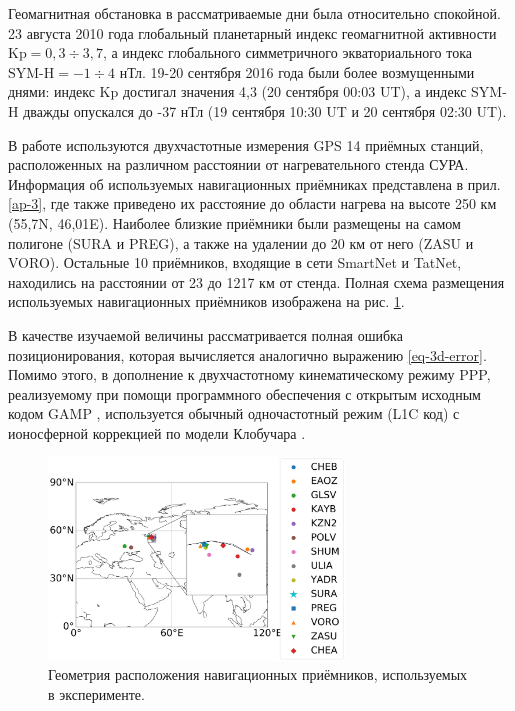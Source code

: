 Геомагнитная обстановка в рассматриваемые дни была относительно спокойной.
23 августа 2010 года глобальный планетарный индекс геомагнитной активности $\text{Kp}=0,3\div3,7$, а индекс глобального симметричного экваториального тока $\text{SYM-H}=-1\div4$ нТл.
19-20 сентября 2016 года были более возмущенными днями: индекс Kp достигал значения 4,3 (20 сентября 00:03 UT), а индекс SYM-H дважды опускался до -37 нТл (19 сентября 10:30 UT и 20 сентября 02:30 UT).

В работе используются двухчастотные измерения GPS 14 приёмных станций, расположенных на различном расстоянии от нагревательного стенда СУРА.
Информация об используемых навигационных приёмниках представлена в прил. \ref{ap-3}, где также приведено их расстояние до области нагрева на высоте 250 км (55,7\degree N, 46,01\degree E).
Наиболее близкие приёмники были размещены на самом полигоне (SURA и PREG), а также на удалении до 20 км от него (ZASU и VORO).
Остальные 10 приёмников, входящие в сети SmartNet и TatNet, находились на расстоянии от 23 до 1217 км от стенда.  
Полная схема размещения используемых навигационных приёмников изображена на рис. \ref{fig-sites}.

В качестве изучаемой величины рассматривается полная ошибка позиционирования, которая вычисляется аналогично выражению \eqref{eq-3d-error}.
Помимо этого, в дополнение к двухчастотному кинематическому режиму PPP, реализуемому при помощи программного обеспечения с открытым исходным кодом GAMP \cite{Zhou2018}, используется обычный одночастотный режим (L1C код) с ионосферной коррекцией по модели Клобучара \cite{Klobuchar1987}. 
\clearpage
\begin{figure}[h]
\centering    
\includegraphics[width=0.7\textwidth]{fig/sites.png}    
\caption{Геометрия расположения навигационных приёмников, используемых в эксперименте.}
\label{fig-sites}      
\end{figure}  
